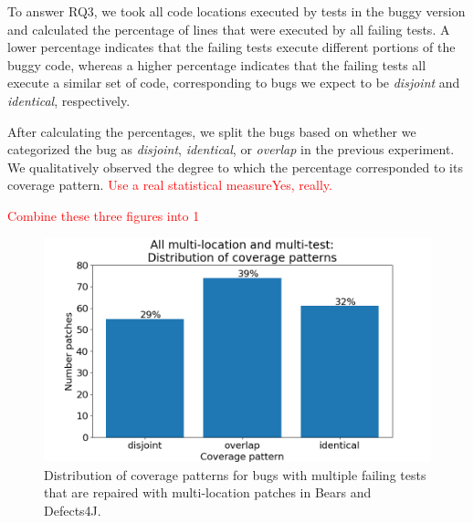 \documentclass[10pt, conference]{IEEEtran}
\newcommand\todo[1]{\textcolor{red}{#1}}
\begin{document}
To answer RQ3, we took all code locations executed by tests in the buggy version and
calculated the percentage of lines that were executed by all failing tests. 
A lower percentage indicates that the failing tests execute different portions of the buggy 
code, whereas a higher percentage indicates that the failing tests all execute a similar
set of code, corresponding to bugs we expect to be \emph{disjoint} and \emph{identical},
respectively.

After calculating the percentages, we split the bugs based on whether we categorized the bug 
as \emph{disjoint}, \emph{identical}, or \emph{overlap} in the previous experiment.
We qualitatively observed the degree to which the percentage corresponded to its coverage 
pattern. \todo{Use a real statistical measure}\todo{Yes, really.}

\todo{Combine these three figures into 1}

\begin{figure}
	\includegraphics[width=\linewidth]{img/coverage-all.png}
	\caption{Distribution of coverage patterns for bugs with multiple failing
      tests that are repaired with multi-location patches in Bears and Defects4J.}
	\label{fig:coverage-all}
\end{figure}
\end{document}
